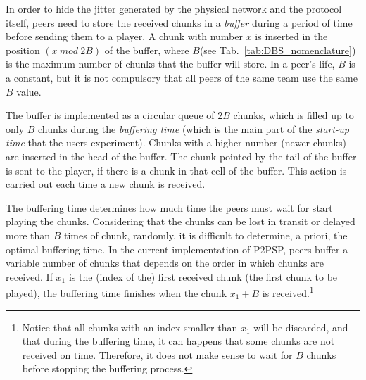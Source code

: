 
\label{sec:buffering_chunks}

In order to hide the jitter generated by the physical network and the
protocol itself, peers need to store the received chunks in a
\emph{buffer} during a period of time before sending them to a
player. A chunk with number $x$ is inserted in the position
$(x~\mathit{mod}~2B)$ of the buffer, where $B$(see
Tab.~\ref{tab:DBS_nomenclature}) is the maximum number of chunks that
the buffer will store. In a peer's life, $B$ is a constant, but it is
not compulsory that all peers of the same team use the same $B$ value.

The buffer is implemented as a circular queue of $2B$ chunks, which is
filled up to only $B$ chunks during the \emph{buffering time} (which
is the main part of the \emph{start-up time} that the users
experiment). Chunks with a higher number (newer chunks) are inserted
in the head of the buffer. The chunk pointed by the tail of the buffer
is sent to the player, if there is a chunk in that cell of the
buffer. This action is carried out each time a new chunk is received.

The buffering time determines how much time the peers must wait for
start playing the chunks. Considering that the chunks can be lost in
transit or delayed more than $B$ times of chunk, randomly, it is
difficult to determine, a priori, the optimal buffering time. In the
current implementation of P2PSP, peers buffer a variable number of
chunks that depends on the order in which chunks are received. If
$x_1$ is the (index of the) first received chunk (the first chunk to
be played), the buffering time finishes when the chunk $x_1+B$ is
received.\footnote{Notice that all chunks with an index smaller than
  $x_1$ will be discarded, and that during the buffering time, it can
  happens that some chunks are not received on time. Therefore, it
  does not make sense to wait for $B$ chunks before stopping the
  buffering process.}


\begin{comment}
An heuristic that
works is the described in the Fig.~\ref{fig:DBS_peer_buffering}. As
can be seen, $\text{chunk\_to\_play}$ points to the first received
chunk, that not necessary is the received chunk with lower
index. After that, the
buffering finishes when a chunk with index $\text{chunk\_to\_play} +
\text{BUFFER\_SIZE}/2$ has been received.\footnote{This not means that
  $\text{BUFFER\_SIZE}/2$ chunks are available in the buffer.}
\end{comment}
